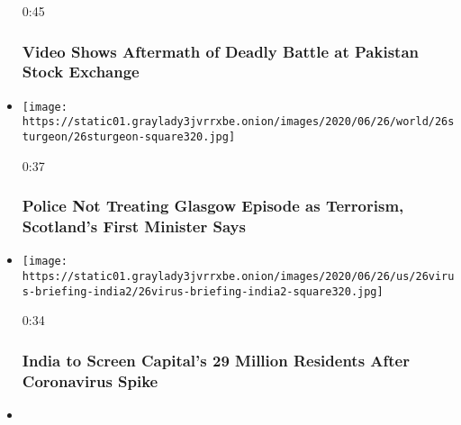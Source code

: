 \begin{itemize}
  0:45

  \hypertarget{video-shows-aftermath-of-deadly-battle-at-pakistan-stock-exchange}{%
  \subsubsection{Video Shows Aftermath of Deadly Battle at Pakistan
  Stock
  Exchange}\label{video-shows-aftermath-of-deadly-battle-at-pakistan-stock-exchange}}
\item
  \href{https://www.nytimes3xbfgragh.onion/video/us/100000007212234/nicola-sturgeon-glasgow-attack.html?action=click\&module=video-series-bar\&region=header\&pgtype=Article\&playlistId=video/world}{}

  \texttt{[image: https://static01.graylady3jvrrxbe.onion/images/2020/06/26/world/26sturgeon/26sturgeon-square320.jpg]}

  0:37

  \hypertarget{police-not-treating-glasgow-episode-as-terrorism-scotlands-first-minister-says}{%
  \subsubsection{Police Not Treating Glasgow Episode as Terrorism,
  Scotland's First Minister
  Says}\label{police-not-treating-glasgow-episode-as-terrorism-scotlands-first-minister-says}}
\item
  \href{https://www.nytimes3xbfgragh.onion/video/us/100000007212150/new-delhi-coronavirus-tests.html?action=click\&module=video-series-bar\&region=header\&pgtype=Article\&playlistId=video/world}{}

  \texttt{[image: https://static01.graylady3jvrrxbe.onion/images/2020/06/26/us/26virus-briefing-india2/26virus-briefing-india2-square320.jpg]}

  0:34

  \hypertarget{india-to-screen-capitals-29-million-residents-after-coronavirus-spike}{%
  \subsubsection{India to Screen Capital's 29 Million Residents After
  Coronavirus
  Spike}\label{india-to-screen-capitals-29-million-residents-after-coronavirus-spike}}
\item
  \href{https://www.nytimes3xbfgragh.onion/video/us/100000007210500/germany-spike-coronavirus-cases.html?action=click\&module=video-series-bar\&region=header\&pgtype=Article\&playlistId=video/world}{}


\end{itemize}
